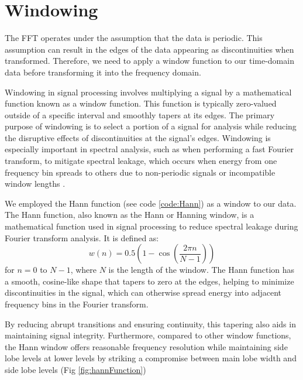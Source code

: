 \section{Windowing}
The FFT operates under the assumption that the data is periodic. This assumption can result in the edges of the data appearing as discontinuities when transformed. Therefore, we need to apply a window function to our time-domain data before transforming it into the frequency domain.

Windowing in signal processing involves multiplying a signal by a mathematical function known as a window function. This function is typically zero-valued outside of a specific interval and smoothly tapers at its edges. The primary purpose of windowing is to select a portion of a signal for analysis while reducing the disruptive effects of discontinuities at the signal's edges. Windowing is especially important in spectral analysis, such as when performing a fast Fourier transform, to mitigate spectral leakage, which occurs when energy from one frequency bin spreads to others due to non-periodic signals or incompatible window lengths \cite{lyons2004understanding}\citep{proakis2007digital}. 

We employed the Hann function (see code \ref{code:Hann}) as a window to our data. The Hann function, also known as the Hann or Hanning window, is a mathematical function used in signal processing to reduce spectral leakage during Fourier transform analysis. It is defined as:
\begin{equation}
    w(n) = 0.5 \left(1 - \cos\left(\frac{2\pi n}{N-1}\right)\right)
\end{equation}
for \( n = 0 \) to \( N-1 \), where \( N \) is the length of the window. The Hann function has a smooth, cosine-like shape that tapers to zero at the edges, helping to minimize discontinuities in the signal, which can otherwise spread energy into adjacent frequency bins in the Fourier transform. 

By reducing abrupt transitions and ensuring continuity, this tapering also aids in maintaining signal integrity. Furthermore, compared to other window functions, the Hann window offers reasonable frequency resolution while maintaining side lobe levels at lower levels by striking a compromise between main lobe width and side lobe levels (Fig \ref{fig:hannFunction})

